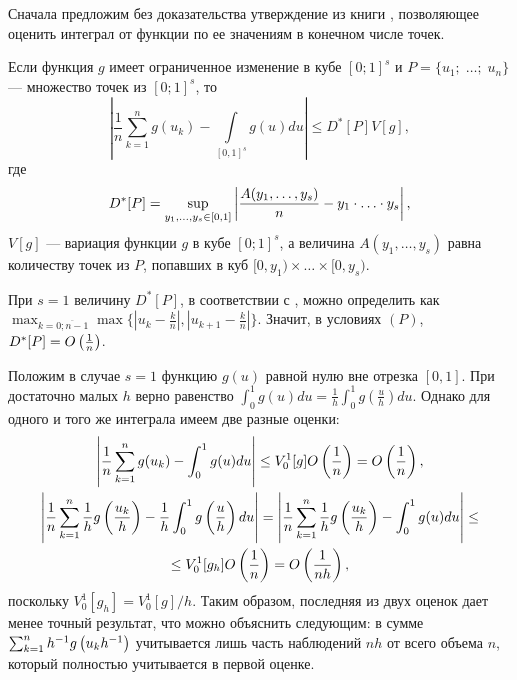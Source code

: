 \documentclass[a4paper,14pt,russian]{article}
\begin{document}
Сначала предложим без доказательства утверждение из книги \cite{Monte}, позволяющее оценить интеграл от функции по ее значениям в конечном числе точек.
\begin{lemma}\label{KH}
Если функция $g$ имеет ограниченное изменение в кубе $[0;1]^s$ и $P=\{u_1;\; \dots;\;u_n\}$ --- множество точек из $[0;1]^s$, то
$$\left|\frac1n \sum^n_{k=1}g(u_k) - \int\limits_{[0,1]^s}g(u)du\right| \leq D^*[P] V[g],$$
где
$$D^*[P]= \sup_{y_1, \ldots, y_s \in [0,1]}\left|\frac{A(y_1, \ldots, y_s)}{n} - y_1 \cdot \ldots \cdot y_s\right|,$$
$V[g]$ --- вариация функции $g$ в кубе $[0;1]^s$, а  величина $A(y_1, \ldots, y_s)$ равна количеству точек из $P$, попавших в куб $[0,y_1) \times \ldots \times [0,y_s)$.
\end{lemma}
\begin{remark}
При $s=1$ величину $D^*[P]$, в соответствии с \cite[теорема 2.6]{Monte}, можно определить как $\max_{k=\overline{0;n-1}}\max\{|u_k-\frac{k}{n}|,|u_{k+1}-\frac{k}{n}|\}$.
Значит, в условиях $(P)$,  $D^*[P] = O\left(\frac1n\right)$.
\end{remark}
\begin{remark}
Положим в случае $s=1$ функцию $g(u)$ равной нулю вне отрезка $[0,1]$.
При достаточно малых $h$ верно равенство $\int_0^1 g(u)du = \frac{1}{h} \int_0^1 g(\frac{u}{h})du$.
Однако для одного и того же интеграла имеем две разные оценки:
\begin{multline*}
\left|\frac1n \sum^n_{k=1}g(u_k) - \int_0^1 g(u)du \right| \leq V_{0}^{1}[g]O\left(\frac{1}{n}\right) = O\left(\frac{1}{n}\right),\\
\left|\frac1n \sum^n_{k=1}\frac{1}{h} g\left(\frac{u_k}{h}\right) - \frac{1}{h} \int_0^1 g\left(\frac{u}{h}\right)du \right| = \left|\frac1n \sum^n_{k=1}\frac{1}{h} g\left(\frac{u_k}{h}\right) - \int_0^1 g(u)du \right| \leq \\
\leq  V_{0}^{1}[g_{h}]O\left(\frac{1}{n}\right) = O\left(\frac{1}{nh}\right),
\end{multline*}
поскольку $V_{0}^{1}[g_{h}] = V_{0}^{1}[g]/{h}$.
Таким образом, последняя из двух оценок дает менее точный результат, что можно объяснить следующим:
в сумме $\sum^n_{k=1}h^{-1}\* g\br{u_k h^{-1}}$ учитывается лишь часть наблюдений
${nh}$ от всего объема $n$, который полностью учитывается в первой оценке.
\end{remark}
\end{document}
